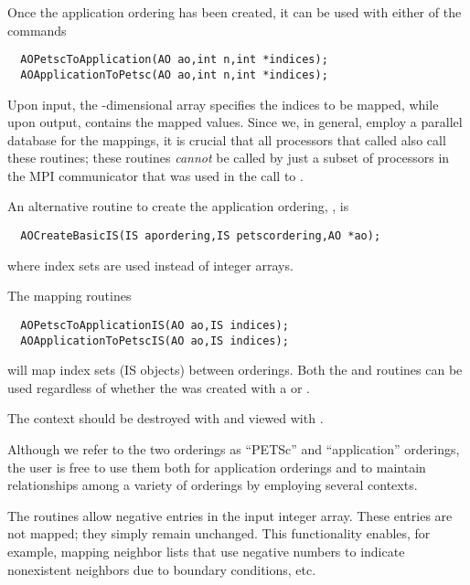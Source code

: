 Once the application ordering has been created, it can be used
with either of the commands
\begin{verbatim}
  AOPetscToApplication(AO ao,int n,int *indices);
  AOApplicationToPetsc(AO ao,int n,int *indices);
\end{verbatim}
Upon input, the -dimensional array  specifies 
the indices to be mapped, while upon output,  contains
the mapped values.
 
Since we, in general, employ a parallel database for the
 mappings, it is crucial that all processors that
called  also call these routines; these
routines {\em cannot} be called by just a subset of processors
in the MPI communicator that was used in the call to .

An alternative routine to create the application ordering, , is 
\begin{verbatim}
  AOCreateBasicIS(IS apordering,IS petscordering,AO *ao);
\end{verbatim}
where index sets are used instead of integer arrays. 

The 
mapping routines 
\begin{verbatim}
  AOPetscToApplicationIS(AO ao,IS indices);
  AOApplicationToPetscIS(AO ao,IS indices);
\end{verbatim}
 
will map index sets (IS objects) between orderings. Both the  and 
 routines can be used regardless of whether the  was 
created with a  or .

  
The  context should be destroyed with 
and viewed with .

Although we refer to the two orderings as ``PETSc'' and
``application'' orderings, the user is free to use them both for
application orderings and to maintain relationships among a variety of
orderings by employing several  contexts.

The  routines allow negative entries in the input
integer array. These entries are not mapped; they simply remain
unchanged.  This functionality enables, for example, mapping neighbor
lists that use negative numbers to indicate nonexistent neighbors due
to boundary conditions, etc.

